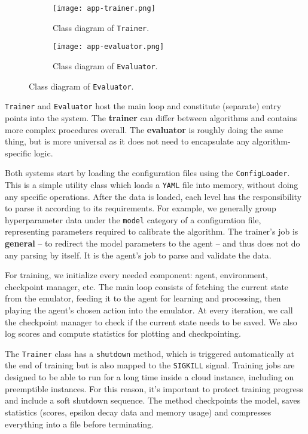 \begin{figure}[ht]
    \centering
    \begin{subfigure}[b]{0.5\textwidth}
        \centering
        \texttt{[image: app-trainer.png]}
        \caption{Class diagram of \texttt{Trainer}.}
        \label{fig:trainer-diagram}
    \end{subfigure}%
    \hfill
    \begin{subfigure}[b]{0.5\textwidth}
        \centering
        \texttt{[image: app-evaluator.png]}
        \caption{Class diagram of \texttt{Evaluator}.}
        \label{fig:evaluator-diagram}
    \end{subfigure}
\end{figure}

\texttt{Trainer} and \texttt{Evaluator} host the main loop and constitute (separate) entry points into the system.
The \textbf{trainer} can differ between algorithms and contains more complex procedures overall.
The \textbf{evaluator} is roughly doing the same thing, but is more universal as it does not need to encapsulate any algorithm-specific logic.

Both systems start by loading the configuration files using the \texttt{ConfigLoader}.
This is a simple utility class which loads a \texttt{YAML} file into memory, without doing any specific operations.
After the data is loaded, each level has the responsibility to parse it according to its requirements.
For example, we generally group hyperparameter data under the \texttt{model} category of a configuration file, representing parameters required to calibrate the algorithm.
The trainer's job is \textbf{general} -- to redirect the model parameters to the agent -- and thus does not do any parsing by itself.
It is the agent’s job to parse and validate the data.

For training, we initialize every needed component: agent, environment, checkpoint manager, etc.
The main loop consists of fetching the current state from the emulator, feeding it to the agent for learning and processing, then playing the agent’s chosen action into the emulator.
At every iteration, we call the checkpoint manager to check if the current state needs to be saved.
We also log scores and compute statistics for plotting and checkpointing.

The \texttt{Trainer} class has a \texttt{shutdown} method, which is triggered automatically at the end of training but is also mapped to the \texttt{SIGKILL} signal.
Training jobs are designed to be able to run for a long time inside a cloud instance, including on preemptible instances\footnotemark{}.
For this reason, it's important to protect training progress and include a soft shutdown sequence.
The method checkpoints the model, saves statistics (scores, epsilon decay data and memory usage) and compresses everything into a file before terminating.

